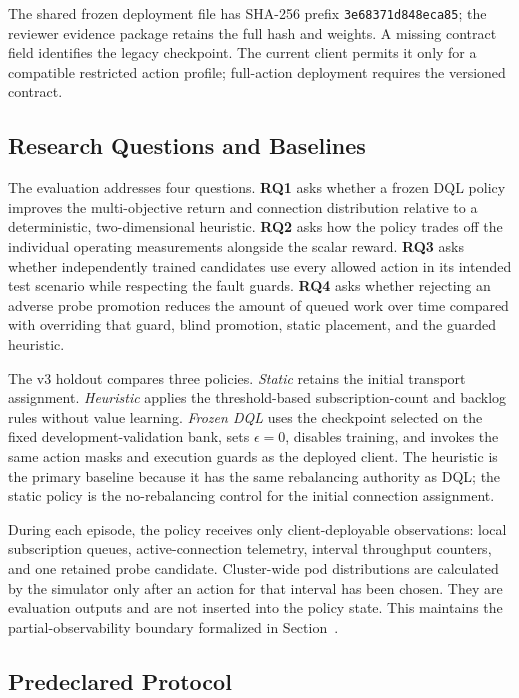 The shared frozen deployment file has SHA-256 prefix
\texttt{3e68371d848eca85}; the reviewer evidence package retains the full hash
and weights. A missing contract field identifies the legacy checkpoint.
The current client permits it only for a compatible restricted action profile;
full-action deployment requires the versioned contract.

\subsection{Research Questions and Baselines}

The evaluation addresses four questions.  \textbf{RQ1} asks whether a frozen
DQL policy improves the multi-objective return and connection distribution
relative to a deterministic, two-dimensional heuristic.  \textbf{RQ2} asks
how the policy trades off the individual operating measurements alongside
the scalar reward. \textbf{RQ3} asks whether independently trained candidates use every allowed action in its
intended test scenario while respecting the fault guards.
\textbf{RQ4} asks whether rejecting an adverse probe promotion reduces the amount of queued work over time compared with overriding that
guard, blind promotion, static placement, and the guarded heuristic.

The v3 holdout compares three policies.  \emph{Static} retains the initial
transport assignment.  \emph{Heuristic} applies the threshold-based
subscription-count and backlog rules without value learning.  \emph{Frozen
DQL} uses the checkpoint selected on the fixed development-validation bank,
sets $\epsilon=0$, disables training, and invokes the same action masks and
execution guards as the deployed client.  The heuristic is the primary
baseline because it has the same rebalancing authority as DQL; the static
policy is the no-rebalancing control for the initial connection assignment.

During each episode, the policy receives only client-deployable observations:
local subscription queues, active-connection telemetry, interval throughput
counters, and one retained probe candidate.  Cluster-wide pod distributions are
calculated by the simulator only after an action for that interval has been
chosen.  They are evaluation outputs and are not inserted into the policy
state.  This maintains the partial-observability boundary formalized in
Section~.

\subsection{Predeclared Protocol}

